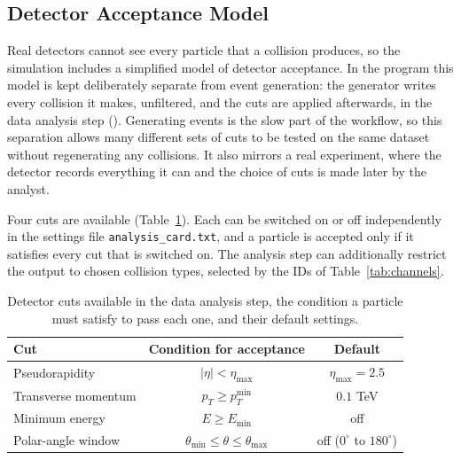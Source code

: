 \documentclass{article}
\begin{document}
\subsection{Detector Acceptance Model}
\label{ssec:detector_model}
Real detectors cannot see every particle that a collision produces, so the simulation includes a simplified model of detector acceptance. In the program this model is kept deliberately separate from event generation: the generator writes every collision it makes, unfiltered, and the cuts are applied afterwards, in the data analysis step (). Generating events is the slow part of the workflow, so this separation allows many different sets of cuts to be tested on the same dataset without regenerating any collisions. It also mirrors a real experiment, where the detector records everything it can and the choice of cuts is made later by the analyst.

Four cuts are available (Table~\ref{tab:cuts}). Each can be switched on or off independently in the settings file \texttt{analysis\_card.txt}, and a particle is accepted only if it satisfies every cut that is switched on. The analysis step can additionally restrict the output to chosen collision types, selected by the IDs of Table~\ref{tab:channels}.

\begin{table}[H]
\centering
\begin{tabular}{l c c}
\hline
Cut & Condition for acceptance & Default \\
\hline
Pseudorapidity & $|\eta| < \eta_{\max}$ & $\eta_{\max} = 2.5$ \\
Transverse momentum & $p_T \ge p_T^{\min}$ & $0.1$ TeV \\
Minimum energy & $E \ge E_{\min}$ & off \\
Polar-angle window & $\theta_{\min} \le \theta \le \theta_{\max}$ & off ($0^\circ$ to $180^\circ$) \\
\hline
\end{tabular}
\caption{Detector cuts available in the data analysis step, the condition a particle must satisfy to pass each one, and their default settings.}
\label{tab:cuts}
\end{table}
\end{document}
